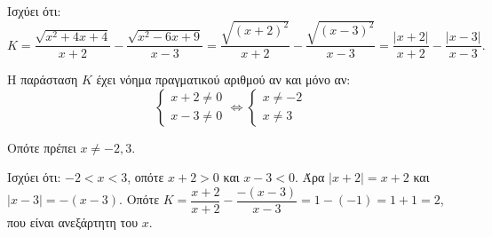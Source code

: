 
\begin{alist}
\item Ισχύει ότι:
\[K = \dfrac{\sqrt{x^2 + 4x + 4}}{x + 2} - \dfrac{\sqrt{x^2 - 6x + 9}}{x - 3} = \dfrac{\sqrt{(x + 2)^2}}{x + 2} - \dfrac{\sqrt{(x - 3)^2}}{x - 3} = \dfrac{|x + 2|}{x + 2} - \dfrac{|x - 3|}{x - 3}.\]

Η παράσταση $K$ έχει νόημα πραγματικού αριθμού αν και μόνο αν:
\[\begin{cases} x + 2 \ne 0 \\ x - 3 \ne 0 \end{cases} \Leftrightarrow \begin{cases} x \ne -2 \\ x \ne 3 \end{cases}\]

Οπότε πρέπει $x \ne -2, 3$.

\item Ισχύει ότι: $-2 < x < 3$, οπότε $x + 2 > 0$ και $x - 3 < 0$.
Άρα $|x + 2| = x + 2$ και $|x - 3| = -(x - 3)$.
Οπότε $K = \dfrac{x + 2}{x + 2} - \dfrac{-(x - 3)}{x - 3} = 1 - (-1) = 1 + 1 = 2$, που είναι ανεξάρτητη του $x$.
\end{alist}

